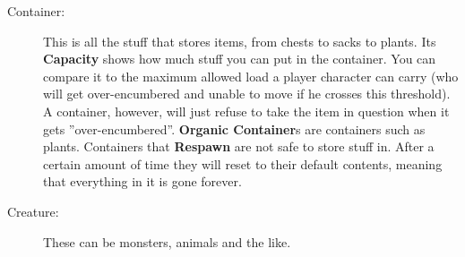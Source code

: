 \begin{description}
 \item[Container:] This is all the stuff that stores items, from chests to sacks to plants. Its \textbf{Capacity} shows how much stuff you can put in the container. You can compare it to the maximum allowed load a player character can carry (who will get over-encumbered and unable to move if he crosses this threshold). A container, however, will just refuse to take the item in question when it gets ''over-encumbered''. \textbf{Organic Container}s are containers such as plants. Containers that \textbf{Respawn} are not safe to store stuff in. After a certain amount of time they will reset to their default contents, meaning that everything in it is gone forever.
 \item[Creature:] These can be monsters, animals and the like. 
 
\end{description}